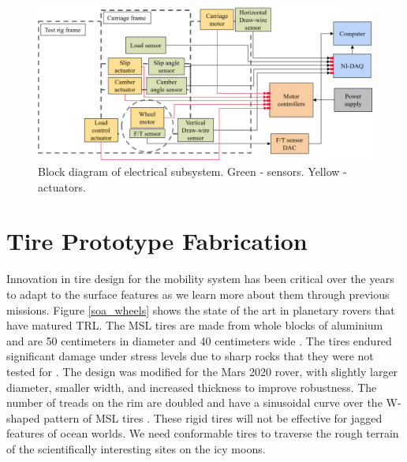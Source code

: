 \documentclass{article}
\begin{document}
\begin{figure}[hbt!]
\centering
\includegraphics[width=1\textwidth]{plots/electrical_components_diagram.PNG}
\caption{Block diagram of electrical subsystem. Green - sensors. Yellow - actuators.}
\label{fig:electrical-diagram}
\end{figure}

\section{Tire Prototype Fabrication}
\label{sec:tire-prototyoe-fabrication}
Innovation in tire design for the mobility system has been critical over the years to adapt to the surface features as we learn more about them through previous missions. Figure \ref{soa_wheels} shows the state of the art in planetary rovers that have matured TRL. The MSL tires are made from whole blocks of aluminium and are 50 centimeters in diameter and 40 centimeters wide \cite{haggart2008mobility}. The tires endured significant damage under stress levels due to sharp rocks that they were not tested for \cite{toupet2018traction}. The design was modified for the Mars 2020 rover, with slightly larger diameter, smaller width, and increased thickness to improve robustness. The number of treads on the rim are doubled and have a sinusoidal curve over the W-shaped pattern of MSL tires \cite{inotsume2019parametric}. These rigid tires will not be effective for jagged features of ocean worlds. We need conformable tires to traverse the rough terrain of the scientifically interesting sites on the icy moons.
\end{document}

